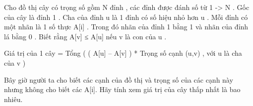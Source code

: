 Cho đồ thị cây có trọng số gồm N đỉnh , các đỉnh được đánh số từ 1 -> N . Gốc của cây là đỉnh 1 . Cha của đỉnh u là 1 đỉnh có số hiệu nhỏ hơn u . Mỗi đỉnh có một nhãn là 1 số thực A[i] . Trong đó nhãn của đỉnh 1 bằng 1 và nhãn của đỉnh lá bằng 0 . Biết rằng A[v] ≤ A[u] nếu v là con của u .   


   Giá trị của 1 cây = Tổng (  ( A[u] – A[v] ) * Trọng số cạnh (u,v)  , với u là cha của v )   


   Bây giờ người ta cho biết các cạnh của đồ thị và trọng số của các cạnh này nhưng không cho biết các A[i]. Hãy tính xem giá trị của cây thấp nhất là bao nhiêu.